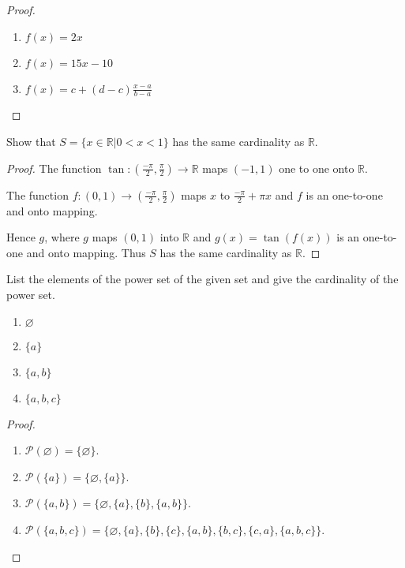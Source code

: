 \begin{proof}
    \begin{enumerate}[label={\textbf{\alph*.}},itemsep=0pt]
        \item $f(x) = 2x$
        \item $f(x) = 15x - 10$
        \item $f(x) = c + (d-c)\frac{x-a}{b-a}$
    \end{enumerate}
\end{proof}

\newpage
\begin{exercise}
    Show that $S = \{ x\in\mathbb{R} \vert 0 < x < 1 \}$ has the same cardinality as $\mathbb{R}$.
\end{exercise}

\begin{proof}
    The function $\tan: \left(\frac{-\pi}{2}, \frac{\pi}{2}\right) \to \mathbb{R}$ maps $(-1, 1)$ one to one onto $\mathbb{R}$.

    The function $f: (0, 1) \to \left(\frac{-\pi}{2}, \frac{\pi}{2}\right)$ maps $x$ to $\frac{-\pi}{2} + \pi x$ and $f$ is an one-to-one and onto mapping.

    Hence $g$, where $g$ maps $(0, 1)$ into $\mathbb{R}$ and $g(x) = \tan(f(x))$ is an one-to-one and onto mapping. Thus $S$ has the same cardinality as $\mathbb{R}$.
\end{proof}

\newpage
\begin{exercise}
    List the elements of the power set of the given set and give the cardinality of the power set.
    \begin{enumerate}[label={\textbf{\alph*.}}]
        \item $\varnothing$
        \item $\{ a \}$
        \item $\{ a, b \}$
        \item $\{ a, b, c \}$
    \end{enumerate}
\end{exercise}

\begin{proof}
    \begin{enumerate}[label={\textbf{\alph*.}}]
        \item $\mathscr{P}(\varnothing) = \{ \varnothing \}$.
        \item $\mathscr{P}(\{ a \}) = \{ \varnothing, \{ a \} \}$.
        \item $\mathscr{P}(\{ a, b \}) = \{ \varnothing, \{ a \}, \{ b \}, \{ a, b \} \}$.
        \item $\mathscr{P}(\{ a, b, c \}) = \{ \varnothing, \{ a \}, \{ b \}, \{ c \}, \{ a, b \}, \{ b, c \}, \{ c, a \}, \{ a, b, c \} \}$.
    \end{enumerate}
\end{proof}

